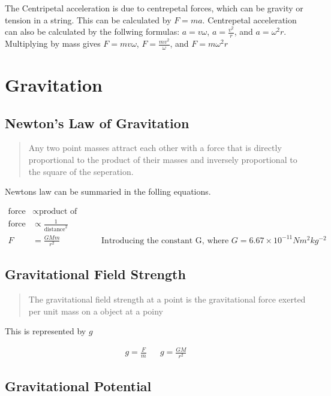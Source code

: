 \documentclass{scrbook}
\begin{document}
	The Centripetal acceleration is due to centrepetal forces, which can be gravity or tension in a string. This can be calculated by $F = ma$. Centrepetal acceleration can also be calculated by the follwing formulas: $a = v\omega$, $a = \frac{v^2}{r}$, and $a = \omega ^2 r$. Multiplying by mass gives $F = mv\omega$, $F = \frac{mv^2}{\omega}$, and $F = m\omega^2r$

\section{Gravitation}

\subsection{Newton's Law of Gravitation}

	\begin{quote}
		Any two point masses attract each other with a force that is directly proportional to the product of their masses and inversely proportional to the square of the seperation.
	\end{quote}

	Newtons law can be summaried in the folling equations.
	
	\begin{align*}
		\text{force} &\propto \text{product  of  masses} &
		\\
		\text{force} &\propto \frac{1}{\text{distance}^2} &
		\\
		F &= \frac{GMm}{r^2} & \text{Introducing the constant G, where } G = 6.67\times 10^{-11} Nm^2kg^{-2}
	\end{align*}

\subsection{Gravitational Field Strength}

	\begin{quote}
		The gravitational field strength at a point is the gravitational force exerted per unit mass on a object at a poiny
	\end{quote}

	This is represented by $g$

	\begin{align*}g = \frac{F}{m} & & g = \frac{GM}{r^2}\end{align*}
	
\subsection{Gravitational Potential}
\end{document}
